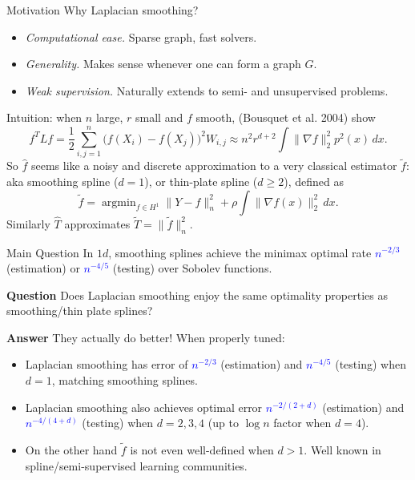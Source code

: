 \documentclass[xcolor=dvipsnames]{beamer}
\newcommand{\wh}[1]{\widehat{#1}}
\newcommand{\wt}[1]{\widetilde{#1}}
\DeclareMathOperator*{\argmin}{argmin}
\newcommand{\blue}[1]{\textcolor{blue}{#1}}
\begin{document}
\begin{frame}{Motivation}
Why Laplacian smoothing?
\begin{itemize}
	\item \emph{Computational ease.} Sparse graph, fast solvers.
	\item \emph{Generality.} Makes sense whenever one can form a graph $G$. 
	\item \emph{Weak supervision.} Naturally extends to semi- and unsupervised problems.
\end{itemize}
Intuition: when $n$ large, $r$ small and $f$ smooth, {(Bousquet et al. 2004)} show
\begin{equation*}
f^T L f = \frac{1}{2}\sum_{i,j = 1}^{n} \bigl(f(X_i) - f(X_j)\bigr)^2 W_{i,j} \approx n^2 r^{d + 2} \int \|\nabla f\|_2^2 p^2(x) \,dx.
\end{equation*}
So $\wh{f}$ seems like a noisy and discrete approximation to a very classical estimator $\wt{f}$: aka \alert{smoothing spline} ($d = 1$), or \alert{thin-plate spline} ($d \geq 2$), defined as
\begin{equation*}
\widetilde{f} = \argmin_{f \in H^1} \|Y - f\|_n^2 + \rho \int \|\nabla f(x)\|_2^2  \,dx.
\end{equation*}
Similarly $\wh{T}$ approximates $\wt{T} = \|\wt{f}\|_n^2$. 
\end{frame}

\begin{frame}{Main Question}
In $1d$, smoothing splines achieve the minimax optimal rate \blue{$n^{-2/3}$} (estimation) or \blue{$n^{-4/5}$} (testing) over Sobolev functions.
\begin{block}{{\bf Question}}
	Does Laplacian smoothing enjoy the same optimality properties as smoothing/thin plate splines?
\end{block}

\begin{block}{{\bf Answer}}
	They actually do better! When properly tuned:
	\begin{itemize}
		\item Laplacian smoothing has error of \blue{$n^{-2/3}$} (estimation) and \blue{$n^{-4/5}$} (testing) when $d = 1$, matching smoothing splines.
		\item Laplacian smoothing also achieves optimal error \blue{$n^{-2/(2 + d)}$} (estimation) and \blue{$n^{-4/(4 + d)}$} (testing) when $d = 2,3,4$ (up to $\log n$ factor when $d = 4$).
		\item On the other hand $\wt{f}$ is \alert{not even well-defined} when $d > 1$. Well known in spline/semi-supervised learning communities.
	\end{itemize}
\end{block}
\end{frame}
\end{document}
